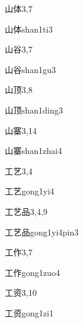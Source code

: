 \begin{entry}{山体}{3,7}
  \begin{phonetics}{山体}{shan1ti3}
  \end{phonetics}
\end{entry}

\begin{entry}{山谷}{3,7}
  \begin{phonetics}{山谷}{shan1gu3}
  \end{phonetics}
\end{entry}

\begin{entry}{山顶}{3,8}
  \begin{phonetics}{山顶}{shan1ding3}
  \end{phonetics}
\end{entry}

\begin{entry}{山寨}{3,14}
  \begin{phonetics}{山寨}{shan1zhai4}
  \end{phonetics}
\end{entry}

\begin{entry}{工艺}{3,4}
  \begin{phonetics}{工艺}{gong1yi4}
  \end{phonetics}
\end{entry}

\begin{entry}{工艺品}{3,4,9}
  \begin{phonetics}{工艺品}{gong1yi4pin3}
  \end{phonetics}
\end{entry}

\begin{entry}{工作}{3,7}
  \begin{phonetics}{工作}{gong1zuo4}
  \end{phonetics}
\end{entry}

\begin{entry}{工资}{3,10}
  \begin{phonetics}{工资}{gong1zi1}
  \end{phonetics}
\end{entry}

